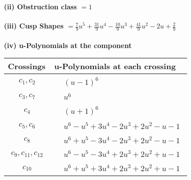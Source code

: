 \documentclass[1p]{elsarticle_modified}
\theoremstyle{definition}
\begin{document}
\flushleft \textbf{(ii) Obstruction class $= 1$}\\~\\
\flushleft \textbf{(iii) Cusp Shapes $= \frac{7}{9} u^5+\frac{31}{9} u^4-\frac{10}{9} u^3+\frac{41}{9} u^2-2 u+\frac{2}{9}$}\\~\\
\newpage\renewcommand{\arraystretch}{1}
\flushleft \textbf{(iv) u-Polynomials at the component}\newline \\
\begin{tabular}{m{50pt}|m{274pt}}
Crossings & \hspace{64pt}u-Polynomials at each crossing \\
\hline $$\begin{aligned}c_{1},c_{2}\end{aligned}$$&$\begin{aligned}
&(u-1)^6
\end{aligned}$\\
\hline $$\begin{aligned}c_{3},c_{7}\end{aligned}$$&$\begin{aligned}
&u^6
\end{aligned}$\\
\hline $$\begin{aligned}c_{4}\end{aligned}$$&$\begin{aligned}
&(u+1)^6
\end{aligned}$\\
\hline $$\begin{aligned}c_{5},c_{6}\end{aligned}$$&$\begin{aligned}
&u^6- u^5+3 u^4-2 u^3+2 u^2- u-1
\end{aligned}$\\
\hline $$\begin{aligned}c_{8}\end{aligned}$$&$\begin{aligned}
&u^6+u^5-3 u^4-2 u^3+2 u^2- u-1
\end{aligned}$\\
\hline $$\begin{aligned}c_{9},c_{11},c_{12}\end{aligned}$$&$\begin{aligned}
&u^6- u^5-3 u^4+2 u^3+2 u^2+u-1
\end{aligned}$\\
\hline $$\begin{aligned}c_{10}\end{aligned}$$&$\begin{aligned}
&u^6+u^5+3 u^4+2 u^3+2 u^2+u-1
\end{aligned}$\\
\hline
\end{tabular}\\~\\
\end{document}
